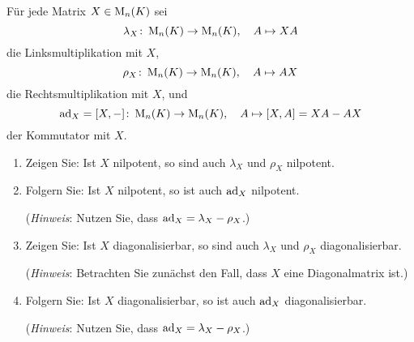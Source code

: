 \documentclass[a4paper,10pt]{scrartcl}
\begin{document}


\begin{question}
  Für jede Matrix $X \in \operatorname{M}_n(K)$ sei
  \[
    \lambda_X \colon \operatorname{M}_n(K) \to \operatorname{M}_n(K),
    \quad
    A \mapsto XA
  \]
  die Linksmultiplikation mit $X$,
  \[
    \rho_X \colon \operatorname{M}_n(K) \to \operatorname{M}_n(K),
    \quad
    A \mapsto AX
  \]
  die Rechtsmultiplikation mit $X$, und
  \[
    \operatorname{ad}_X = [X, -] \colon \operatorname{M}_n(K) \to \operatorname{M}_n(K),
    \quad
    A \mapsto [X, A] = XA - AX
  \]
  der Kommutator mit $X$.
  \begin{enumerate}[leftmargin=*]
    \item
      Zeigen Sie:
      Ist $X$ nilpotent, so sind auch $\lambda_X$ und $\rho_X$ nilpotent.
    \item
      Folgern Sie:
      Ist $X$ nilpotent, so ist auch $\operatorname{ad}_X$ nilpotent.
      
      (\emph{Hinweis}:
      Nutzen Sie, dass $\operatorname{ad}_X = \lambda_X - \rho_X$.)
    \item
      Zeigen Sie:
      Ist $X$ diagonalisierbar, so sind auch $\lambda_X$ und $\rho_X$ diagonalisierbar.
      
      (\emph{Hinweis}:
      Betrachten Sie zunächst den Fall, dass $X$ eine Diagonalmatrix ist.)
    \item
      Folgern Sie:
      Ist $X$ diagonalisierbar, so ist auch $\operatorname{ad}_X$ diagonalisierbar.
      
      (\emph{Hinweis}:
       Nutzen Sie, dass $\operatorname{ad}_X = \lambda_X - \rho_X$.)
  \end{enumerate}
\end{question}
\end{document}
